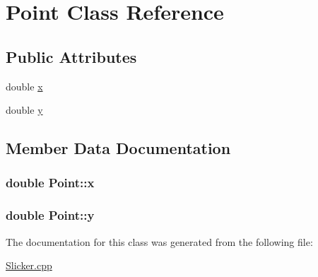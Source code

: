 \hypertarget{classPoint}{}\section{Point Class Reference}
\label{classPoint}
\subsection*{Public Attributes}
\begin{DoxyCompactItemize}
\item 
double \hyperlink{classPoint_ab99c56589bc8ad5fa5071387110a5bc7}{x}
\item 
double \hyperlink{classPoint_afa38be143ae800e6ad69ce8ed4df62d8}{y}
\end{DoxyCompactItemize}


\subsection{Member Data Documentation}
\subsubsection[{\texorpdfstring{x}{x}}]{\setlength{\rightskip}{0pt plus 5cm}double Point\+::x}\hypertarget{classPoint_ab99c56589bc8ad5fa5071387110a5bc7}{}\label{classPoint_ab99c56589bc8ad5fa5071387110a5bc7}
\subsubsection[{\texorpdfstring{y}{y}}]{\setlength{\rightskip}{0pt plus 5cm}double Point\+::y}\hypertarget{classPoint_afa38be143ae800e6ad69ce8ed4df62d8}{}\label{classPoint_afa38be143ae800e6ad69ce8ed4df62d8}


The documentation for this class was generated from the following file\+:\begin{DoxyCompactItemize}
\item 
\hyperlink{Slicker_8cpp}{Slicker.\+cpp}\end{DoxyCompactItemize}
